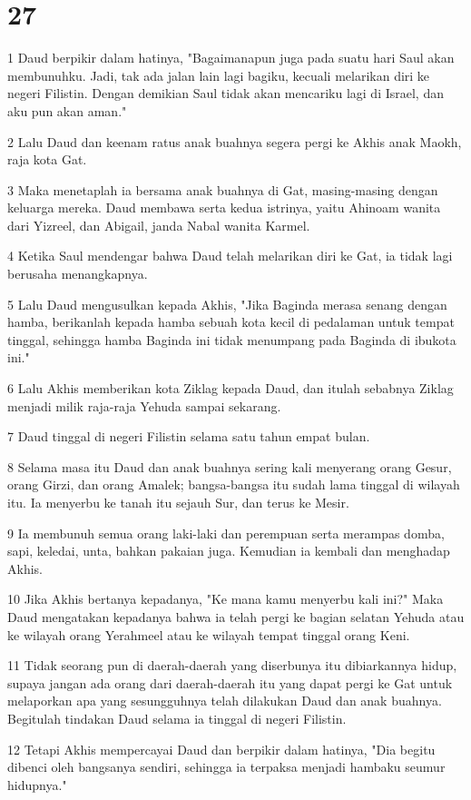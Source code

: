 \chapter{27}

\par 1 Daud berpikir dalam hatinya, "Bagaimanapun juga pada suatu hari Saul akan membunuhku. Jadi, tak ada jalan lain lagi bagiku, kecuali melarikan diri ke negeri Filistin. Dengan demikian Saul tidak akan mencariku lagi di Israel, dan aku pun akan aman."
\par 2 Lalu Daud dan keenam ratus anak buahnya segera pergi ke Akhis anak Maokh, raja kota Gat.
\par 3 Maka menetaplah ia bersama anak buahnya di Gat, masing-masing dengan keluarga mereka. Daud membawa serta kedua istrinya, yaitu Ahinoam wanita dari Yizreel, dan Abigail, janda Nabal wanita Karmel.
\par 4 Ketika Saul mendengar bahwa Daud telah melarikan diri ke Gat, ia tidak lagi berusaha menangkapnya.
\par 5 Lalu Daud mengusulkan kepada Akhis, "Jika Baginda merasa senang dengan hamba, berikanlah kepada hamba sebuah kota kecil di pedalaman untuk tempat tinggal, sehingga hamba Baginda ini tidak menumpang pada Baginda di ibukota ini."
\par 6 Lalu Akhis memberikan kota Ziklag kepada Daud, dan itulah sebabnya Ziklag menjadi milik raja-raja Yehuda sampai sekarang.
\par 7 Daud tinggal di negeri Filistin selama satu tahun empat bulan.
\par 8 Selama masa itu Daud dan anak buahnya sering kali menyerang orang Gesur, orang Girzi, dan orang Amalek; bangsa-bangsa itu sudah lama tinggal di wilayah itu. Ia menyerbu ke tanah itu sejauh Sur, dan terus ke Mesir.
\par 9 Ia membunuh semua orang laki-laki dan perempuan serta merampas domba, sapi, keledai, unta, bahkan pakaian juga. Kemudian ia kembali dan menghadap Akhis.
\par 10 Jika Akhis bertanya kepadanya, "Ke mana kamu menyerbu kali ini?" Maka Daud mengatakan kepadanya bahwa ia telah pergi ke bagian selatan Yehuda atau ke wilayah orang Yerahmeel atau ke wilayah tempat tinggal orang Keni.
\par 11 Tidak seorang pun di daerah-daerah yang diserbunya itu dibiarkannya hidup, supaya jangan ada orang dari daerah-daerah itu yang dapat pergi ke Gat untuk melaporkan apa yang sesungguhnya telah dilakukan Daud dan anak buahnya. Begitulah tindakan Daud selama ia tinggal di negeri Filistin.
\par 12 Tetapi Akhis mempercayai Daud dan berpikir dalam hatinya, "Dia begitu dibenci oleh bangsanya sendiri, sehingga ia terpaksa menjadi hambaku seumur hidupnya."

